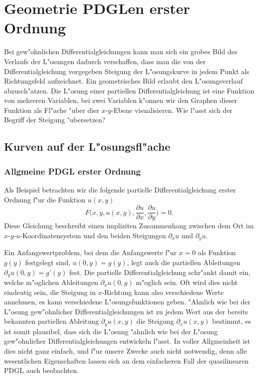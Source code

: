 %
%
%
\chapter{Geometrie PDGLen erster Ordnung\label{chapter-geometrie}}
Bei gew"ohnlichen Differentialgleichungen kann man sich ein grobes
Bild des Verlaufs der L"osungen dadurch verschaffen, dass man
die von der Differentialgleichung vorgegeben Steigung der L"osungskurve
in jedem Punkt als Richtungsfeld aufzeichnet. Ein geometrisches
Bild erlaubt den L"osungsverlauf abzusch"atzen. Die L"osung einer
partiellen Differentialgleichung ist eine Funktion von mehreren Variablen,
bei zwei Variablen k"onnen wir den Graphen dieser Funktion als Fl"ache
"uber dier $x$-$y$-Ebene visualisieren. Wie l"asst sich der Begriff der
Steigung "ubersetzen?

\section{Kurven auf der L"osungsfl"ache}
\subsection{Allgmeine PDGL erster Ordnung}
Als Beispiel betrachten wir die folgende partielle Differentialgleichung
erster Ordnung f"ur die Funktion $u(x,y)$
$$
F\biggl(x,y,u(x,y),\frac{\partial u}{\partial x},\frac{\partial u}{\partial y}\biggr)=0.
$$
Diese Gleichung beschreibt einen impliziten Zusammenhang zwischen
dem Ort im $x$-$y$-$u$-Koordinatensystem und den beiden Steigungen
$\partial_xu$ und $\partial_yu$.

Ein Anfangswertproblem, bei dem die Anfangswerte f"ur $x=0$ als
Funktion $g(y)$ festgelegt sind, $u(0,y)=g(y)$, legt auch die
partiellen Ableitungen $\partial_y u(0,y)=g'(y)$ fest.  Die partielle
Differentialgleichung schr"ankt damit ein, welche m"oglichen Ableitungen
$\partial_xu(0,y)$ m"oglich sein. Oft wird dies nicht eindeutig sein,
die Steigung in $x$-Richtung kann also verschiedene Werte annehmen,
es kann verschiedene L"osungsfunktionen geben. "Ahnlich wie bei der
L"osung gew"ohnlicher Differentialgleichungen ist zu jedem Wert
aus der bereits bekannten partiellen Ableitung $\partial_yu(x,y)$
die Steigung $\partial_xu(x,y)$ bestimmt, es ist somit plausibel, dass
sich die L"osung "ahnlich wie bei der L"osung gew"ohnlicher Differentialgleichungen
entwickeln l"asst. In voller Allgmeinheit ist dies nicht ganz einfach,
und f"ur unsere Zwecke auch nicht notwendig, denn alle wesentlichen
Eigenschaften lassen sich an dem einfacheren Fall der quasilinearen
PDGL auch beobachten.

